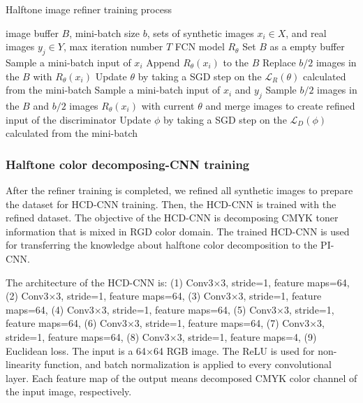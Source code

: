 \documentclass[5p, times]{elsarticle}
\begin{document}
\begin{algorithm}[t]
	\caption{Halftone image refiner training process}
	\begin{algorithmic}[1]
		\INPUT image buffer $B$, mini-batch size $b$, sets of synthetic images $x_i \in X$, and real images $y_j \in Y$, max iteration number $T$
		\OUTPUT FCN model $R_\theta$
		\STATE Set $B$ as a empty buffer
			\STATE Sample a mini-batch input of $x_i$
				\STATE Append $R_\theta(x_i)$ to the $B$
			\ELSE
				\STATE Replace $b/2$ images in the $B$ with $R_\theta(x_i)$
			\ENDIF
			\STATE Update $\theta$ by taking a SGD step on the $\mathcal{L}_R(\theta)$ calculated from the mini-batch
			\ENDFOR
		\STATE Sample a mini-batch input of $x_i$ and $y_j$
		\STATE Sample $b/2$ images in the $B$ and $b/2$ images $R_\theta(x_i)$ with current $\theta$ and merge images to create refined input of the discriminator
		\STATE Update $\phi$ by taking a SGD step on the $\mathcal{L}_D(\phi)$ calculated from the mini-batch
		\ENDFOR
	\end{algorithmic}
\end{algorithm}

\subsubsection{Halftone color decomposing-CNN training}

After the refiner training is completed, we refined all synthetic images to prepare the dataset for HCD-CNN training. Then, the HCD-CNN is trained with the refined dataset. The objective of the HCD-CNN is decomposing CMYK toner information that is mixed in RGD color domain. The trained HCD-CNN is used for transferring the knowledge about halftone color decomposition to the PI-CNN.

The architecture of the HCD-CNN is: (1) Conv3$\times$3, stride=1, feature maps=64, (2) Conv3$\times$3, stride=1, feature maps=64, (3) Conv3$\times$3, stride=1, feature maps=64, (4) Conv3$\times$3, stride=1, feature maps=64, (5) Conv3$\times$3, stride=1, feature maps=64, (6) Conv3$\times$3, stride=1, feature maps=64, (7) Conv3$\times$3, stride=1, feature maps=64, (8) Conv3$\times$3, stride=1, feature maps=4, (9) Euclidean loss. The input is a 64$\times$64 RGB image. The ReLU is used for non-linearity function, and batch normalization is applied to every convolutional layer. Each feature map of the output means decomposed CMYK color channel of the input image, respectively.
\end{document}
